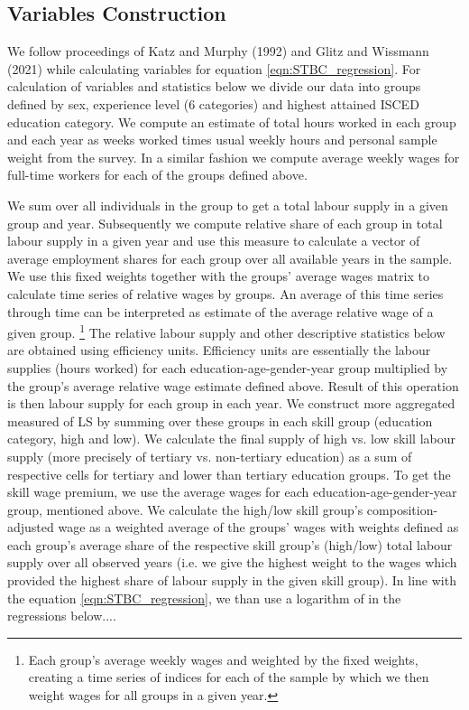 \documentclass{article}
\begin{document}
\subsection{Variables Construction}
We follow proceedings of Katz and Murphy (1992) and Glitz and Wissmann (2021) while calculating variables for equation \ref{eqn:STBC_regression}. For calculation of variables and statistics below we divide our data into groups defined by sex, experience level (6 categories) and highest attained ISCED education category.
We compute an estimate of total hours worked in each group and each year as weeks worked times usual weekly hours and personal sample weight from the survey. In a similar fashion we compute average weekly wages for full-time workers for each of the groups defined above.

We sum over all individuals in the group to get a total labour supply in a given group and year. Subsequently we compute relative share of each group in total labour supply in a given year and use this measure to calculate a vector of average employment shares for each group over all available years in the sample. We use this fixed weights together with the groups' average wages matrix to calculate time series of relative wages by groups. An average of this time series through time can be interpreted as estimate of the average relative wage of a given group. \footnote{Each group's average weekly wages and weighted by the fixed weights, creating a time series of indices for each of the sample by which we then weight wages for all groups in a given year.} %
The relative labour supply and other descriptive statistics below are obtained using efficiency units. Efficiency units are essentially the labour supplies (hours worked) for each education-age-gender-year group multiplied by the group's average relative wage estimate defined above. Result of this operation is then labour supply for each group in each year. We construct more aggregated measured of LS by summing over these groups in each skill group (education category, high and low).
We calculate the final supply of high vs. low skill labour supply (more precisely of tertiary vs. non-tertiary education) as a sum of respective cells for tertiary and lower than tertiary education groups.
To get the skill wage premium, we use the average wages for each education-age-gender-year group, mentioned above. We calculate the high/low skill group's composition-adjusted wage as a weighted average of the groups' wages with weights defined as each group's average share of the respective skill group's (high/low) total labour supply over all observed years (i.e. we give the highest weight to the wages which provided the highest share of labour supply in the given skill group).
In line with the equation \ref{eqn:STBC_regression}, we than use a logarithm of in the regressions below....
\end{document}
